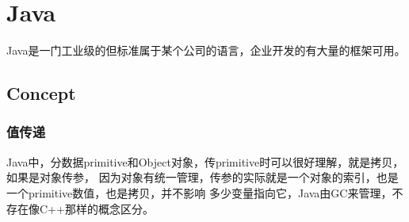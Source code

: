 \chapter{Java}

Java是一门工业级的但标准属于某个公司的语言，企业开发的有大量的框架可用。

\section{Concept}

\subsection{值传递}

Java中，分数据primitive和Object对象，传primitive时可以很好理解，就是拷贝，如果是对象传参，
因为对象有统一管理，传参的实际就是一个对象的索引，也是一个primitive数值，也是拷贝，并不影响
多少变量指向它，Java由GC来管理，不存在像C++那样的概念区分。




